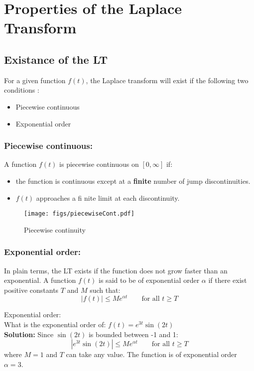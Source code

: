 \section{Properties of the Laplace Transform}
\subsection{Existance of the LT}
For a given function $f(t)$, the Laplace transform will exist if the following two conditions :
\begin{itemize}
\item Piecewise continuous
\item Exponential order 
\end{itemize}
\subsubsection{Piecewise continuous:} A function $f(t)$ is piecewise continuous on $\left[0,\infty\right]$ if:
\begin{itemize}
\item the function is continuous except at a \textbf{finite} number of jump discontinuities.
\item $f(t)$ approaches a fi nite limit at each discontinuity.
\end{itemize}


\begin{figure}
\texttt{[image: figs/piecewiseCont.pdf]}
\caption{Piecewise continuity}
\end{figure}

\subsubsection{Exponential order:} In plain terms, the LT exists if the function does not grow faster than an exponential. A function $f(t)$ is said to be of exponential order $\alpha$ if there exist positive constants $T$ and $M$ such that:
\begin{equation*}
\left|f(t)\right|\leq Me^{\alpha t} \qquad \text{for all } t\geq T
\end{equation*}
\begin{exmp}{Exponential order:}\\
What is the exponential order of: $f(t)=e^{3t}\sin(2t)$\\
\textbf{Solution:} 
Since $\sin(2t)$ is bounded between -1 and 1:
\begin{equation*}
\left|e^{3t}\sin(2t)\right|\leq Me^{\alpha t} \qquad \text{for all } t\geq T
\end{equation*}
where $M=1$ and $T$ can take any value. The function is of exponential order $\alpha=3$.
\end{exmp}


